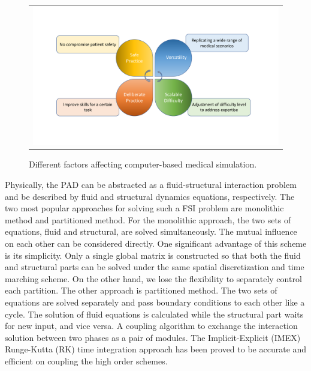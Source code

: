 \begin{figure}[H]
	\centering
	\begin{tabular}{c}
		\includegraphics[width=1.0\textwidth]{./pics/computer_simulation}
	\end{tabular}
	\caption{\footnotesize Different factors affecting computer-based medical simulation.} \label{fig: ch1f1}
\end{figure}

Physically, the PAD can be abstracted as a fluid-structural interaction problem and be described by fluid and structural dynamics equations, respectively.  The two most popular approaches for solving such a FSI problem are monolithic method\cite{hubner2004monolithic, degroote2009performance} and partitioned method\cite{kuttler2008fixed, vierendeels2007implicit}. For the monolithic approach, the two sets of equations, fluid and structural, are solved simultaneously. The mutual influence on each other can be considered directly. One significant advantage of this scheme is its simplicity. Only a single global matrix is constructed so that both the fluid and structural parts can be solved under the same spatial discretization and time marching scheme. On the other hand, we lose the flexibility to separately control each partition. The other approach is partitioned method. The two sets of equations are solved separately and pass boundary conditions to each other like a cycle. The solution of fluid equations is calculated while the structural part waits for new input, and vice versa. A coupling algorithm to exchange the interaction solution between two phases as a pair of modules. The Implicit-Explicit (IMEX) Runge-Kutta (RK) time integration approach has been proved to be accurate and efficient on coupling the high order schemes\cite{zhang2016high}.


